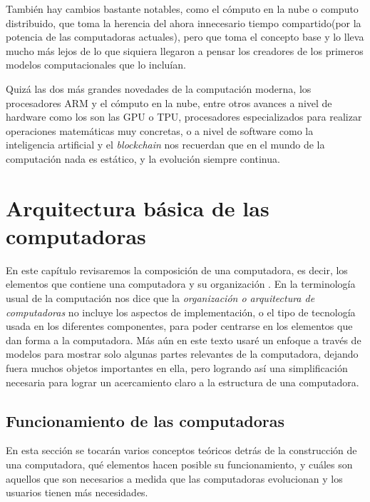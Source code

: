 \documentclass[letterpaper,12pt,oneside]{book}
\begin{document}
        También hay cambios bastante notables, como el cómputo en la nube o 
		computo distribuido, que toma la 
		herencia del ahora innecesario tiempo compartido(por la potencia de las computadoras actuales), pero que toma el concepto base y lo lleva mucho más lejos de lo que siquiera 
		llegaron a pensar los creadores de los primeros modelos computacionales que lo incluían.
		
		Quizá las dos más grandes novedades de la computación moderna, los procesadores ARM y el cómputo en la nube, entre otros avances a nivel de hardware
		como los son las GPU o TPU, procesadores especializados para realizar operaciones matemáticas muy concretas, o a nivel de software como
		la inteligencia artificial y el \textit{blockchain} nos recuerdan que en el mundo de la computación nada es estático, y la evolución siempre continua.
		 
\clearpage	

\chapter{Arquitectura básica de las computadoras} %

	En este capítulo revisaremos la composición de una computadora, es decir, los elementos que contiene una computadora y su organización
	. En la terminología usual de la computación \cite{tanenbaum_structured_2013} nos dice que la  \textit{organización o arquitectura de computadoras}
	no incluye los aspectos de implementación, o el tipo de tecnología usada en los diferentes componentes, para poder centrarse en los
	elementos que dan forma a la computadora. Más aún en este texto usaré un enfoque a través de modelos para mostrar solo algunas partes relevantes
	de la computadora, dejando fuera muchos objetos importantes en ella, pero logrando así una simplificación necesaria para lograr un acercamiento
	claro a la estructura de una computadora.

	\section{Funcionamiento de las computadoras}   %
		
		En esta sección se tocarán varios conceptos teóricos detrás de la construcción de una computadora, qué elementos hacen posible su funcionamiento,
		y cuáles son aquellos que son necesarios a medida que las computadoras evolucionan y los usuarios tienen más necesidades.
		
\end{document}
